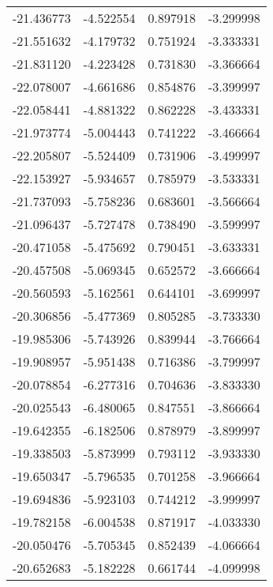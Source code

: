 \begin{tabular}{rrrr}
      -21.436773 &        -4.522554 &    0.897918 &  -3.299998 \\
      -21.551632 &        -4.179732 &    0.751924 &  -3.333331 \\
      -21.831120 &        -4.223428 &    0.731830 &  -3.366664 \\
      -22.078007 &        -4.661686 &    0.854876 &  -3.399997 \\
      -22.058441 &        -4.881322 &    0.862228 &  -3.433331 \\
      -21.973774 &        -5.004443 &    0.741222 &  -3.466664 \\
      -22.205807 &        -5.524409 &    0.731906 &  -3.499997 \\
      -22.153927 &        -5.934657 &    0.785979 &  -3.533331 \\
      -21.737093 &        -5.758236 &    0.683601 &  -3.566664 \\
      -21.096437 &        -5.727478 &    0.738490 &  -3.599997 \\
      -20.471058 &        -5.475692 &    0.790451 &  -3.633331 \\
      -20.457508 &        -5.069345 &    0.652572 &  -3.666664 \\
      -20.560593 &        -5.162561 &    0.644101 &  -3.699997 \\
      -20.306856 &        -5.477369 &    0.805285 &  -3.733330 \\
      -19.985306 &        -5.743926 &    0.839944 &  -3.766664 \\
      -19.908957 &        -5.951438 &    0.716386 &  -3.799997 \\
      -20.078854 &        -6.277316 &    0.704636 &  -3.833330 \\
      -20.025543 &        -6.480065 &    0.847551 &  -3.866664 \\
      -19.642355 &        -6.182506 &    0.878979 &  -3.899997 \\
      -19.338503 &        -5.873999 &    0.793112 &  -3.933330 \\
      -19.650347 &        -5.796535 &    0.701258 &  -3.966664 \\
      -19.694836 &        -5.923103 &    0.744212 &  -3.999997 \\
      -19.782158 &        -6.004538 &    0.871917 &  -4.033330 \\
      -20.050476 &        -5.705345 &    0.852439 &  -4.066664 \\
      -20.652683 &        -5.182228 &    0.661744 &  -4.099998 \\

\end{tabular}
